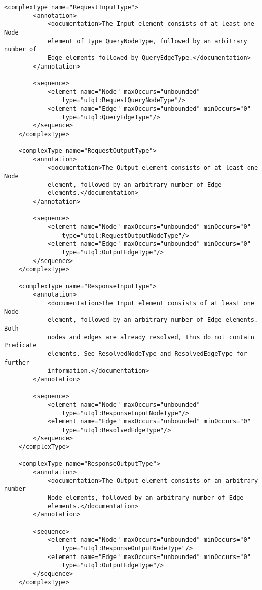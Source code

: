 \documentclass[11pt]{article}
\begin{document}
\begin{Verbatim}[fontsize=\footnotesize,tabsize=2]
    <complexType name="RequestInputType">
        <annotation>
            <documentation>The Input element consists of at least one Node
            element of type QueryNodeType, followed by an arbitrary number of
            Edge elements followed by QueryEdgeType.</documentation>
        </annotation>
        
        <sequence>
            <element name="Node" maxOccurs="unbounded"
				type="utql:RequestQueryNodeType"/>
            <element name="Edge" maxOccurs="unbounded" minOccurs="0"
				type="utql:QueryEdgeType"/>
        </sequence>
    </complexType>
    
    <complexType name="RequestOutputType">
        <annotation>
            <documentation>The Output element consists of at least one Node
            element, followed by an arbitrary number of Edge
            elements.</documentation>
        </annotation>
        
        <sequence>
            <element name="Node" maxOccurs="unbounded" minOccurs="0"
				type="utql:RequestOutputNodeType"/>
            <element name="Edge" maxOccurs="unbounded" minOccurs="0"
				type="utql:OutputEdgeType"/>
        </sequence>
    </complexType>
    
    <complexType name="ResponseInputType">
        <annotation>
            <documentation>The Input element consists of at least one Node
            element, followed by an arbitrary number of Edge elements. Both
            nodes and edges are already resolved, thus do not contain Predicate
            elements. See ResolvedNodeType and ResolvedEdgeType for further
            information.</documentation>
        </annotation>
        
        <sequence>
            <element name="Node" maxOccurs="unbounded"
				type="utql:ResponseInputNodeType"/>
            <element name="Edge" maxOccurs="unbounded" minOccurs="0"
				type="utql:ResolvedEdgeType"/>
        </sequence>
    </complexType>
    
    <complexType name="ResponseOutputType">
        <annotation>
            <documentation>The Output element consists of an arbitrary number
            Node elements, followed by an arbitrary number of Edge
            elements.</documentation>
        </annotation>
        
        <sequence>
            <element name="Node" maxOccurs="unbounded" minOccurs="0"
				type="utql:ResponseOutputNodeType"/>
            <element name="Edge" maxOccurs="unbounded" minOccurs="0"
				type="utql:OutputEdgeType"/>
        </sequence>
    </complexType>
    

\end{Verbatim}
\end{document}
